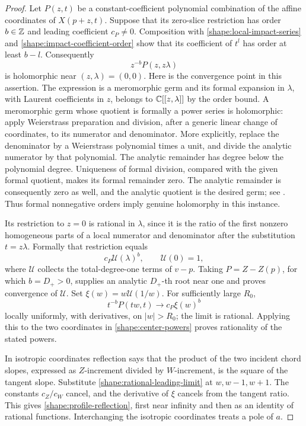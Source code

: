 \begin{proof}
Let \(P(z,t)\) be a constant-coefficient polynomial combination of the
affine coordinates of \(X(p+z,t)\). Suppose that its zero-slice
restriction has order \(b\in\mathbb Z\) and leading coefficient \(c_P\ne0\).
Composition with \eqref{shape:local-impact-series} and
\eqref{shape:impact-coefficient-order} show that its coefficient of
\(t^l\) has order at least \(b-l\). Consequently
\[
 z^{-b}P(z,z\lambda)
\]
is holomorphic near \((z,\lambda)=(0,0)\). Here is the convergence
point in this assertion. The expression is a meromorphic germ and its
formal expansion in \(\lambda\), with Laurent coefficients in \(z\),
belongs to \(\mathbb C[[z,\lambda]]\) by the order bound. A meromorphic germ
whose quotient is formally a power series is holomorphic: apply
Weierstrass preparation and division, after a generic linear change of
coordinates, to its numerator and denominator. More explicitly, replace
the denominator by a Weierstrass polynomial times a unit, and divide
the analytic numerator by that polynomial. The analytic remainder has
degree below the polynomial degree. Uniqueness of formal division,
compared with the given formal quotient, makes its formal remainder
zero. The analytic remainder is consequently zero as well, and the
analytic quotient is the desired germ; see
\cite[Theorem~6.1.1]{Hormander1990}. Thus formal nonnegative orders
imply genuine holomorphy in this instance.

Its restriction to \(z=0\) is rational in \(\lambda\), since it is the
ratio of the first nonzero homogeneous parts of a local numerator and
denominator after the substitution \(t=z\lambda\). Formally that
restriction equals
\[
 c_P\mathcal U(\lambda)^b,\qquad \mathcal U(0)=1,
\]
where \(\mathcal U\) collects the total-degree-one terms of \(v-p\).
Taking \(P=Z-Z(p)\), for which \(b=D_+>0\), supplies an analytic
\(D_+\)-th root near one and proves convergence of \(\mathcal U\).
Set \(\xi(w)=w\mathcal U(1/w)\). For sufficiently large \(R_0\),
\begin{equation}
 t^{-b}P(tw,t)\longrightarrow c_P\xi(w)^b
 \label{shape:rational-leading-limit}
\end{equation}
locally uniformly, with derivatives, on \(|w|>R_0\); the limit is
rational. Applying this to the two coordinates in
\eqref{shape:center-powers} proves rationality of the stated powers.

In isotropic coordinates reflection says that the product of the two
incident chord slopes, expressed as \(Z\)-increment divided by
\(W\)-increment, is the square of the tangent slope. Substitute
\eqref{shape:rational-leading-limit} at \(w,w-1,w+1\). The constants
\(c_Z/c_W\) cancel, and the derivative of \(\xi\) cancels from the
tangent ratio. This gives \eqref{shape:profile-reflection}, first near
infinity and then as an identity of rational functions. Interchanging
the isotropic coordinates treats a pole of \(a\).
\end{proof}

